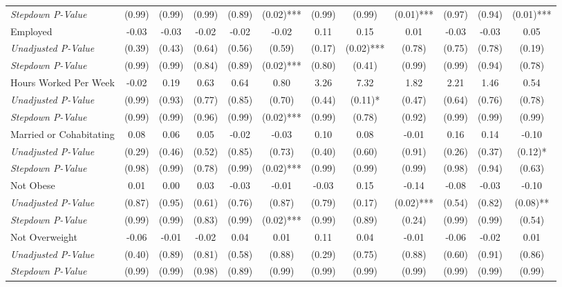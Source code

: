 \begin{tabular}{l c c c c c c c c c c c}
\quad \textit{Stepdown P-Value} & (0.99) & (0.99) & (0.99) & (0.89) & (0.02)*** & (0.99) & (0.99) & (0.01)*** & (0.97) & (0.94) & (0.01)*** \\
Employed & -0.03 & -0.03 & -0.02 & -0.02 & -0.02 & 0.11 & 0.15 & 0.01 & -0.03 & -0.03 & 0.05 \\
\quad \textit{Unadjusted P-Value} & (0.39) & (0.43) & (0.64) & (0.56) & (0.59) & (0.17) & (0.02)*** & (0.78) & (0.75) & (0.78) & (0.19) \\
\quad \textit{Stepdown P-Value} & (0.99) & (0.99) & (0.84) & (0.89) & (0.02)*** & (0.80) & (0.41) & (0.99) & (0.99) & (0.94) & (0.78) \\
Hours Worked Per Week & -0.02 & 0.19 & 0.63 & 0.64 & 0.80 & 3.26 & 7.32 & 1.82 & 2.21 & 1.46 & 0.54 \\
\quad \textit{Unadjusted P-Value} & (0.99) & (0.93) & (0.77) & (0.85) & (0.70) & (0.44) & (0.11)* & (0.47) & (0.64) & (0.76) & (0.78) \\
\quad \textit{Stepdown P-Value} & (0.99) & (0.99) & (0.96) & (0.99) & (0.02)*** & (0.99) & (0.78) & (0.92) & (0.99) & (0.99) & (0.99) \\
Married or Cohabitating & 0.08 & 0.06 & 0.05 & -0.02 & -0.03 & 0.10 & 0.08 & -0.01 & 0.16 & 0.14 & -0.10 \\
\quad \textit{Unadjusted P-Value} & (0.29) & (0.46) & (0.52) & (0.85) & (0.73) & (0.40) & (0.60) & (0.91) & (0.26) & (0.37) & (0.12)* \\
\quad \textit{Stepdown P-Value} & (0.98) & (0.99) & (0.78) & (0.99) & (0.02)*** & (0.99) & (0.99) & (0.99) & (0.98) & (0.94) & (0.63) \\
Not Obese & 0.01 & 0.00 & 0.03 & -0.03 & -0.01 & -0.03 & 0.15 & -0.14 & -0.08 & -0.03 & -0.10 \\
\quad \textit{Unadjusted P-Value} & (0.87) & (0.95) & (0.61) & (0.76) & (0.87) & (0.79) & (0.17) & (0.02)*** & (0.54) & (0.82) & (0.08)** \\
\quad \textit{Stepdown P-Value} & (0.99) & (0.99) & (0.83) & (0.99) & (0.02)*** & (0.99) & (0.89) & (0.24) & (0.99) & (0.99) & (0.54) \\
Not Overweight & -0.06 & -0.01 & -0.02 & 0.04 & 0.01 & 0.11 & 0.04 & -0.01 & -0.06 & -0.02 & 0.01 \\
\quad \textit{Unadjusted P-Value} & (0.40) & (0.89) & (0.81) & (0.58) & (0.88) & (0.29) & (0.75) & (0.88) & (0.60) & (0.91) & (0.86) \\
\quad \textit{Stepdown P-Value} & (0.99) & (0.99) & (0.98) & (0.89) & (0.99) & (0.99) & (0.99) & (0.99) & (0.99) & (0.99) & (0.99) \\

\end{tabular}
